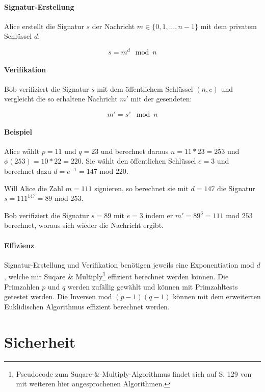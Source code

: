\documentclass[a4paper,12pt,oneside]{scrreprt}
\begin{document}
\paragraph{Signatur-Erstellung}

Alice erstellt die Signatur $s$ der Nachricht $m \in \{0,1,\dots,n-1\}$ mit dem privatem Schlüssel $d$: 

\[ s = m^d \mod n \]

\paragraph{Verifikation}

Bob verifiziert die Signatur $s$ mit dem öffentlichem Schlüssel $(n,e)$ und vergleicht die so erhaltene Nachricht $m'$ mit der gesendeten:

\[ m' = s^e \mod n \]

\paragraph{Beispiel}

Alice wählt $p = 11$ und $q = 23$ und berechnet daraus $n = 11 * 23 = 253$ und $\phi(253) = 10 * 22 = 220$. Sie wählt den öffentlichen Schlüssel $e = 3$ und berechnet dazu $d = e^{-1} = 147$ mod $220$. 

Will Alice die Zahl $m = 111$ signieren, so berechnet sie mit $d = 147$ die Signatur $s = 111^{147} = 89$ mod $253$. 

Bob verifiziert die Signatur $s = 89$ mit $e=3$ indem er $m' = 89^3 = 111$ mod $253$ berechnet, woraus sich wieder die Nachricht ergibt. 

\paragraph{Effizienz}

Signatur-Erstellung und Verifikation benötigen jeweils eine Exponentiation mod $d$, welche mit Suqare \& Multiply\footnote{Pseudocode zum Suqare-\&-Multiply-Algorithmus findet sich auf S. 129 von \cite{beutelspacher2010moderne} mit weiteren hier angesprochenen Algorithmen.} effizient berechnet werden können. Die Primzahlen $p$ und $q$ werden zufällig gewählt und können mit Primzahltests getestet werden. Die Inversen mod $(p-1)(q-1)$ können mit dem erweiterten Euklidischen Algorithmus effizient berechnet werden. 

\section{Sicherheit}
\end{document}
